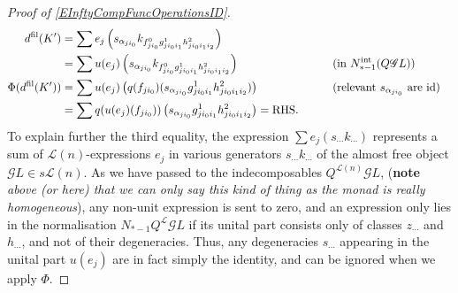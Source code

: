 \documentclass[11pt]{amsart}
\theoremstyle{plain}
\theoremstyle{definition}
\newcommand{\scrG}{\mathscr{G}}
\newcommand{\calL}{\mathcal{L}}
\theoremstyle{plain}
\newcommand{\BSW}{{\scrG}}
\newcommand{\Id}{\textup{id}}
\begin{document}
\begin{Composite functor spectral sequences}
\begin{tricky proofs of operation compatibilities}
\begin{proof}[Proof of \ref{EInftyCompFuncOperationsID}]
\begin{alignat*}{2}
d^\textup{fil}(K')
&=
\sum e_j\left(s_{\alpha_{ji_0}} k_{f^0_{ji_0}g^1_{ji_0i_1}h^2_{ji_0i_1i_2}}\right)%
\\
&=
\sum u(e_j)\left(s_{\alpha_{ji_0}} k_{f^0_{ji_0}g^1_{ji_0i_1}h^2_{ji_0i_1i_2}}\right)%
&\qquad&\text{(in $N_{*-1}^\textup{int}(Q\BSW L)$)}\\
\Phi(d^\textup{fil}(K'))&=
\sum u(e_j)\left( q(f_{ji_0})(s_{\alpha_{ji_0}}g^1_{ji_0i_1}h^2_{ji_0i_1i_2})\right)%
&\qquad&\text{(relevant $s_{\alpha_{ji_0}}$ are $\Id$)}\\
&=
\sum q(u(e_j)(f_{ji_0}))\left(s_{\alpha_{ji_0}} {g^1_{ji_0i_1}h^2_{ji_0i_1i_2}}\right) =\textup{RHS}.
\end{alignat*}
To explain further the third equality,  the expression $\sum e_j(s_{\cdots }k_{\cdots })$ represents a sum of $\calL(n)$-expressions $e_j$ in various generators $s_{\cdots }k_{\cdots }$ of the almost free object $\BSW L\in s\calL(n)$. As we have passed to the indecomposables $Q^{\calL(n)}\BSW L$, (\textbf{note}\emph{ above (or here) that we can only say this kind of thing as the monad is really homogeneous}), any non-unit expression is sent to zero, and an expression only lies in the normalisation $N_{*-1}Q^{\calL}\BSW L$ if its unital part consists only of classes $z_{\cdots}$ and $h_{\cdots }$, and not of their degeneracies. Thus, any degeneracies $s_{\cdots }$ appearing in the unital part $u(e_j)$ are in fact simply the identity, and can be ignored when we apply $\Phi$.
\end{proof}
\end{tricky proofs of operation compatibilities}

\end{Composite functor spectral sequences}
\end{document}
